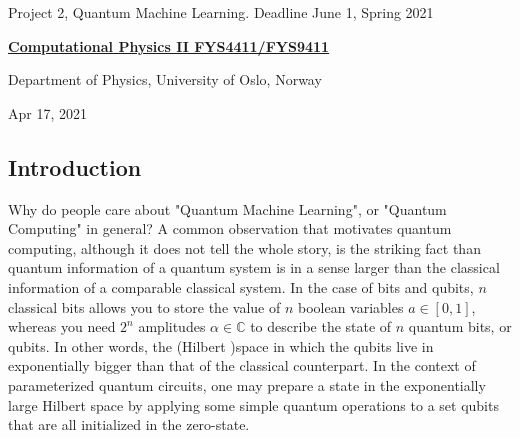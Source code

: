 \documentclass[%
oneside,                 %
final,                   %
10pt]{article}
\begin{document}

\newcommand{\exercisesection}[1]{\subsection*{#1}}






\thispagestyle{empty}

\begin{center}
{\LARGE\bf
\begin{spacing}{1.25}
Project 2, Quantum Machine Learning. Deadline June 1, Spring 2021
\end{spacing}
}
\end{center}


\begin{center}
{\bf \href{{http://www.uio.no/studier/emner/matnat/fys/FYS4411/index-eng.html}}{Computational Physics II FYS4411/FYS9411}}
\end{center}

    \begin{center}
\centerline{{\small Department of Physics, University of Oslo, Norway}}
\end{center}
    

\begin{center}
Apr 17, 2021
\end{center}

\vspace{1cm}


\subsection{Introduction}

Why do people care about "Quantum Machine Learning", or "Quantum Computing" in general? A common observation that motivates quantum computing,
although it does not tell the whole story, is the striking fact than quantum information of a quantum system is in a sense
larger than the classical information of a comparable classical system. In the case of
bits and qubits, $n$ classical bits allows you to store the value of $n$ boolean variables $a \in [0,1]$,
whereas you need $2^n$ amplitudes $\alpha \in \mathbb{C}$ to describe the state of $n$ quantum bits, or qubits.
In other words, the (Hilbert )space in which the qubits live in exponentially bigger than that of the classical
counterpart. In the context of parameterized quantum circuits, one may prepare a state in the exponentially
large Hilbert space by applying some simple quantum operations to a set qubits that are all initialized in the zero-state.
\end{document}
